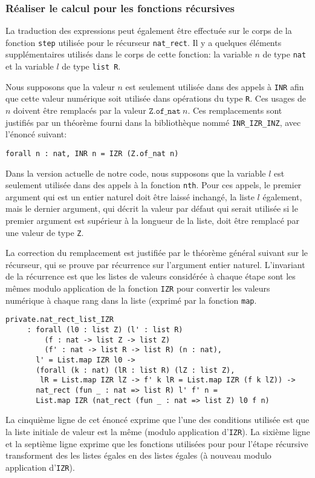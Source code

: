 \documentclass[draft]{jflart}
\begin{document}
\subsubsection{Réaliser le calcul pour les fonctions récursives}
La traduction des expressions peut également être effectuée sur le
corps de la fonction \texttt{step} utilisée pour le récurseur
\texttt{nat\_rect}.  Il y a quelques éléments supplémentaires utilisés
dans le corps de cette fonction: la variable \(n\) de type \texttt{nat}
et la variable \(l\) de type \texttt{list R}.  

Nous supposons que la valeur \(n\) est seulement utilisée dans des
appels à \texttt{INR} afin que cette valeur numérique soit utilisée dans
opérations du type \texttt{R}.  Ces usages de \(n\) doivent être
remplacés par la valeur \(\texttt{Z.of\_nat}~n\).  Ces remplacements sont
justifiés par un théorème fourni dans la bibliothèque nommé
\texttt{INR\_IZR\_INZ}, avec l'énoncé suivant:
\begin{verbatim}
forall n : nat, INR n = IZR (Z.of_nat n)
\end{verbatim}

Dans la version actuelle de notre code, nous supposons que la variable \(l\) est
seulement utilisée dans des appels à la fonction \texttt{nth}.  Pour ces
appels, le premier argument qui est un entier naturel doit être laissé
inchangé, la liste \(l\) également, mais le dernier argument, qui
décrit la valeur par défaut qui serait utilisée si le premier
argument est supérieur à la longueur de la liste, doit être remplacé
par une valeur de type \texttt{Z}.

La correction du remplacement est justifiée par le théorème général
suivant sur le récurseur, qui se prouve par récurrence sur l'argument
entier naturel.  L'invariant de la récurrence est que les listes de
valeurs considérée à chaque étape sont les mêmes modulo application de
la fonction \texttt{IZR} pour convertir les valeurs numérique à chaque
rang dans la liste (exprimé par la fonction \texttt{map}.

\begin{verbatim}
private.nat_rect_list_IZR
     : forall (l0 : list Z) (l' : list R) 
         (f : nat -> list Z -> list Z)
         (f' : nat -> list R -> list R) (n : nat),
       l' = List.map IZR l0 ->
       (forall (k : nat) (lR : list R) (lZ : list Z),
        lR = List.map IZR lZ -> f' k lR = List.map IZR (f k lZ)) ->
       nat_rect (fun _ : nat => list R) l' f' n =
       List.map IZR (nat_rect (fun _ : nat => list Z) l0 f n)
\end{verbatim}
La cinquième ligne de cet énoncé exprime que l'une des conditions utilisée
est que la liste initiale de valeur est la même (modulo application
d'\texttt{IZR}).
La sixième ligne et la septième ligne exprime que les fonctions
utilisées pour pour l'étape récursive transforment des les listes
égales en des listes égales (à nouveau modulo application
d'\texttt{IZR}).
\end{document}
